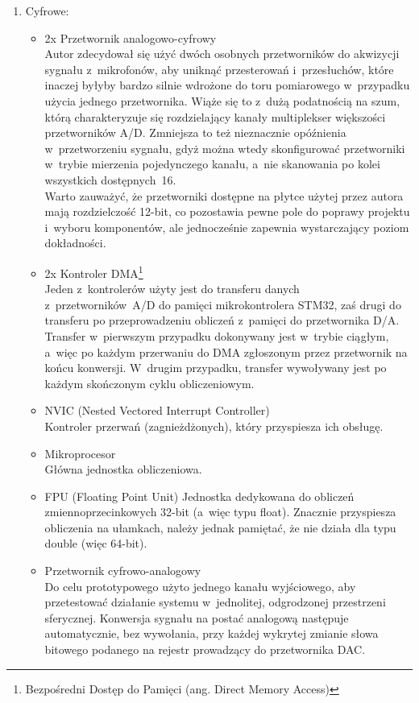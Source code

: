 \begin{enumerate}
\begin{itemize}
		\item Głośnik MG15 \SI{0.1}{\W}; \SI{8}{\ohm}
	\end{itemize}
	\item Cyfrowe:
	\begin{itemize}
		\item 2x Przetwornik analogowo-cyfrowy\\
		Autor zdecydował się użyć dwóch osobnych przetworników do akwizycji sygnału z~mikrofonów, aby uniknąć przesterowań i~przesłuchów, które inaczej byłyby bardzo silnie wdrożone do toru pomiarowego w~przypadku użycia jednego przetwornika. Wiąże się to z~dużą podatnością na szum, którą charakteryzuje się rozdzielający kanały multiplekser większości przetworników A/D. Zmniejsza to też nieznacznie opóźnienia w~przetworzeniu sygnału, gdyż można wtedy skonfigurować przetworniki w~trybie mierzenia pojedynczego kanału, a~nie skanowania po kolei wszystkich dostępnych~16.\\
		Warto zauważyć, że przetworniki dostępne na płytce użytej przez autora mają rozdzielczość 12-bit, co pozostawia pewne pole do poprawy projektu i~wyboru komponentów, ale jednocześnie zapewnia wystarczający poziom dokładności.
		\item 2x Kontroler DMA\footnote{Bezpośredni Dostęp do Pamięci (ang. Direct Memory Access)}\\
		Jeden z~kontrolerów użyty jest do transferu danych z~przetworników~A/D do pamięci mikrokontrolera STM32, zaś drugi do transferu po przeprowadzeniu obliczeń z~pamięci do przetwornika D/A. Transfer w~pierwszym przypadku dokonywany jest w~trybie ciągłym, a~więc po każdym przerwaniu do DMA zgłoszonym przez przetwornik na końcu konwersji. W~drugim przypadku, transfer wywoływany jest po każdym skończonym cyklu obliczeniowym.
		\item NVIC (Nested Vectored Interrupt Controller)\\
		Kontroler przerwań (zagnieżdżonych), który przyspiesza ich obsługę.
		\item Mikroprocesor\\
		Główna jednostka obliczeniowa.
		\item FPU (Floating Point Unit)
		Jednostka dedykowana do obliczeń zmiennoprzecinkowych 32-bit (a~więc typu float). Znacznie przyspiesza obliczenia na ułamkach, należy jednak pamiętać, że nie działa dla typu double (więc 64-bit). 
		\item Przetwornik cyfrowo-analogowy\\
		Do celu prototypowego użyto jednego kanału wyjściowego, aby przetestować działanie systemu w~jednolitej, odgrodzonej przestrzeni sferycznej. Konwersja sygnału na postać analogową następuje automatycznie, bez wywołania, przy każdej wykrytej zmianie słowa bitowego podanego na rejestr prowadzący do przetwornika DAC.
	\end{itemize}
\end{enumerate}

